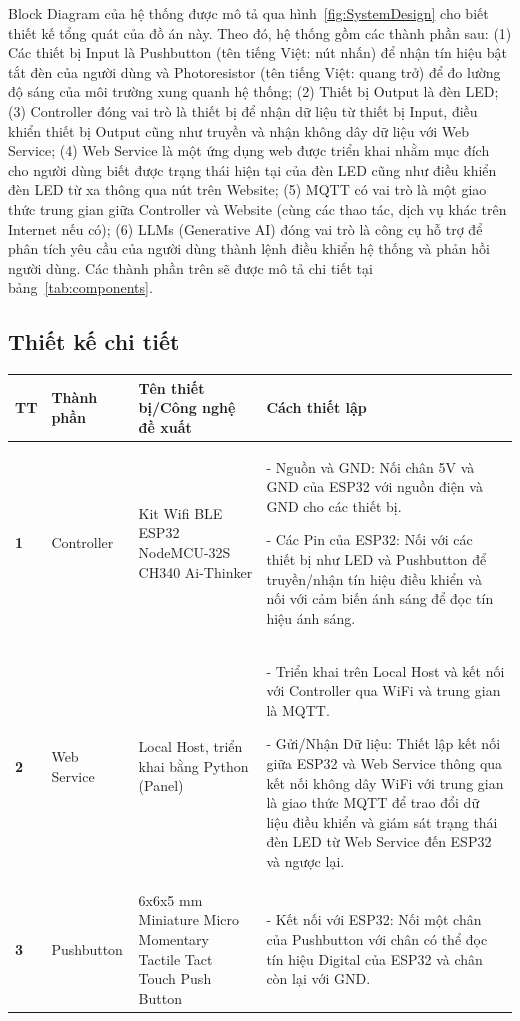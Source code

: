 {Block Diagram của hệ thống được mô tả qua hình~\ref{fig:SystemDesign} cho biết thiết kế tổng quát của đồ án này. Theo đó, hệ thống gồm các thành phần sau: (1) Các thiết bị Input là Pushbutton (tên tiếng Việt: nút nhấn) để nhận tín hiệu bật tắt đèn của người dùng và Photoresistor (tên tiếng Việt: quang trở) để đo lường độ sáng của môi trường xung quanh hệ thống; (2) Thiết bị Output là đèn LED; (3) Controller đóng vai trò là thiết bị để nhận dữ liệu từ thiết bị Input, điều khiển thiết bị Output cũng như truyền và nhận không dây dữ liệu với Web Service; (4) Web Service là một ứng dụng web được triển khai nhằm mục đích cho người dùng biết được trạng thái hiện tại của đèn LED cũng như điều khiển đèn LED từ xa thông qua nút trên Website; (5) MQTT có vai trò là một giao thức trung gian giữa Controller và Website (cùng các thao tác, dịch vụ khác trên Internet nếu có); (6) LLMs (Generative AI) đóng vai trò là công cụ hỗ trợ để phân tích yêu cầu của người dùng thành lệnh điều khiển hệ thống và phản hồi người dùng. Các thành phần trên sẽ được mô tả chi tiết tại bảng~\ref{tab:components}.

\pagebreak
\subsection{Thiết kế chi tiết}\label{subsec:thiet_ke_chi_tiet}
\begin{table}[!h]
\centering
\small
\begin{tabular}{|p{0.6cm}|p{2.5cm}|p{3.5cm}|p{9cm}|}
\hline
\textbf{TT} & \textbf{Thành phần} & \textbf{Tên thiết bị/Công nghệ đề xuất} & \textbf{Cách thiết lập} \\ \hline
\textbf{1} & Controller & Kit Wifi BLE ESP32 NodeMCU-32S CH340 Ai-Thinker & 
- Nguồn và GND: Nối chân 5V và GND của ESP32 với nguồn điện và GND cho các thiết bị.

- Các Pin của ESP32: Nối với các thiết bị như LED và Pushbutton để truyền/nhận tín hiệu điều khiển và nối với cảm biến ánh sáng để đọc tín hiệu ánh sáng.\\ \hline
\textbf{2} & Web Service & Local Host, triển khai bằng Python (Panel) & 
- Triển khai trên Local Host và kết nối với Controller qua WiFi và trung gian là MQTT. 

- Gửi/Nhận Dữ liệu: Thiết lập kết nối giữa ESP32 và Web Service thông qua kết nối không dây WiFi với trung gian là giao thức MQTT để trao đổi dữ liệu điều khiển và giám sát trạng thái đèn LED từ Web Service đến ESP32 và ngược lại. \\ \hline
\textbf{3} & Pushbutton & 6x6x5 mm Miniature Micro Momentary Tactile Tact Touch Push Button & 
- Kết nối với ESP32: Nối một chân của Pushbutton với chân có thể đọc tín hiệu Digital của ESP32 và chân còn lại với GND.


\end{tabular}
\end{table}}
